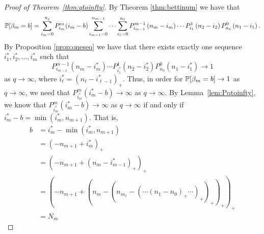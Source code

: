 \begin{proof}[Proof of Theorem~\ref{thm:qtoinfty}]
By Theorem \ref{thm:bettinum} we have that
  \[    
    \mathbb{P}[\beta_m = b] = \sum_{i_m=0}^{n_{j}} P_{i_m}^{m}(i_m-b)
    \sum_{i_{m-1}=0}^{n_{m-1}}\cdots \sum_{i_1 = 0}^{n_1} P_{i_{m-1}}^{m-1}\left(n_{m} -i_m\right) \cdots
     P_{i_1}^1\left(n_2 - i_2\right) P_{n_0}^0 \left(n_1 - i_1\right).
  \]
By Proposition \ref{prop:oneseq} we have that there exists exactly one sequence $i_1^\ast, i_2^\ast, \ldots, i_m^\ast$ such that 
\[
P_{i_{m-1}}^{m-1}\left(n_{m} -i_m^\ast\right) \cdots
     P_{i_1^\ast}^1\left(n_2 - i_2^\ast\right) P_{n_0}^0 \left(n_1 - i_1^\ast\right) \to 1
\]
as $q \to \infty$, where $i_\ell^\ast = (n_\ell -i_{\ell-1}^\ast)_+$. Thus, in order for $\mathbb{P}[\beta_m = b] \to 1$ as $q\to\infty$, we need that $P_{i_m^\ast}^{m}(i_m^\ast-b)\to\infty$ as $q\to\infty$. By Lemma~\ref{lem:Pqtoinfty}, we know that $P_{i_m^\ast}^{m}(i_m^\ast-b)\to\infty$ as $q\to\infty$ if and only if $i_m^\ast - b =\min(i_m^\ast, n_{m+1})$.  That is, 
	\begin{align*}
	b 	&= i_m^\ast - \min(i_m^\ast, n_{m+1})\\
		&= (-n_{m+1} + i_m^\ast)_+\\
		&= (-n_{m+1} + (n_m -i_{m-1}^\ast)_+)_+\\
		&= (-n_{m+1} + (n_m - (n_{m_1} - (\cdots (n_1 - n_0)_+ \cdots)_+)_+)_+ )_+\\
		&= N_m
	\end{align*}
\end{proof}

